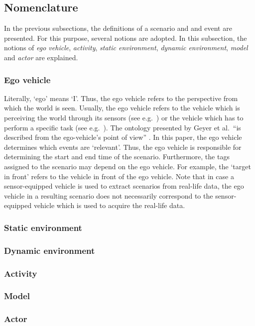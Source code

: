 \subsection{Nomenclature}
\label{sec:nomenclature}

In the previous subsections, the definitions of a scenario and and event are presented. For this purpose, several notions are adopted. In this subsection, the notions of \emph{ego vehicle}, \emph{activity}, \emph{static environment}, \emph{dynamic environment}, \emph{model} and \emph{actor} are explained. 

\subsubsection{Ego vehicle}
Literally, `ego' means `I'. Thus, the ego vehicle refers to the perspective from which the world is seen. Usually, the ego vehicle refers to the vehicle which is perceiving the world through its sensors (see e.g.\ \cite{Bonnin2014}) or the vehicle which has to perform a specific task (see e.g.\ \cite{althoff2017CommonRoad}). The ontology presented by Geyer et al.\ ``is described from the ego-vehicle’s point of view'' \cite{geyer2014}. In this paper, the ego vehicle determines which events are `relevant'. Thus, the ego vehicle is responsible for determining the start and end time of the scenario. Furthermore, the tags assigned to the scenario may depend on the ego vehicle. For example, the `target in front' refers to the vehicle in front of the ego vehicle. Note that in case a sensor-equipped vehicle is used to extract scenarios from real-life data, the ego vehicle in a resulting scenario does not necessarily correspond to the sensor-equipped vehicle which is used to acquire the real-life data.


\subsubsection{Static environment}

\subsubsection{Dynamic environment}

\subsubsection{Activity}

\subsubsection{Model}

\subsubsection{Actor}
